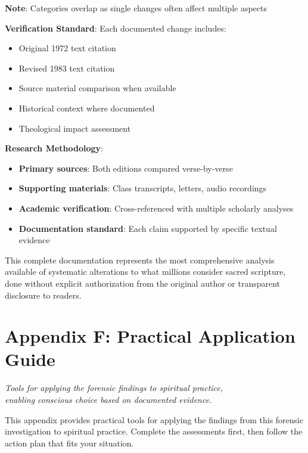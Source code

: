 \documentclass[11pt,twoside]{book}
\begin{document}
\textbf{\textbf{Note}}: Categories overlap as single changes often affect multiple aspects

\textbf{\textbf{Verification Standard}}: Each documented change includes:
\begin{itemize}
\item Original 1972 text citation
\item Revised 1983 text citation
\item Source material comparison when available
\item Historical context where documented
\item Theological impact assessment
\end{itemize}

\textbf{\textbf{Research Methodology}}: 
\begin{itemize}
\item \textbf{\textbf{Primary sources}}: Both editions compared verse-by-verse
\item \textbf{\textbf{Supporting materials}}: Class transcripts, letters, audio recordings
\item \textbf{\textbf{Academic verification}}: Cross-referenced with multiple scholarly analyses
\item \textbf{\textbf{Documentation standard}}: Each claim supported by specific textual evidence
\end{itemize}

This complete documentation represents the most comprehensive analysis available of systematic alterations to what millions consider sacred scripture, done without explicit authorization from the original author or transparent disclosure to readers.
\part*{Appendix F: Practical Application Guide}
\label{sec:orgaba4f4f}
\thispagestyle{chapterpage}

{\centering\itshape Tools for applying the forensic findings to spiritual practice,\\enabling conscious choice based on documented evidence.\par}
\vspace{0.3cm}

\normalfont\justifying
This appendix provides practical tools for applying the findings from this forensic investigation to spiritual practice. Complete the assessments first, then follow the action plan that fits your situation.
\end{document}
